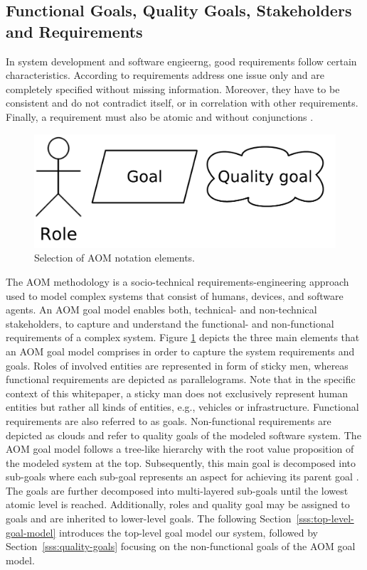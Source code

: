 \documentclass{llncs}
\begin{document}
{		\subsection{Functional Goals, Quality Goals, Stakeholders and Requirements}
			\label{ss:requirement-engineering}
						
			In system development and software engieerng, good requirements follow certain characteristics. According to \cite{davis1993software}\cite{ieee1994ieee} requirements address one issue only and are completely specified without missing information. Moreover, they have to be consistent and do not contradict itself, or in correlation with other requirements. Finally, a requirement must also be atomic and without conjunctions \cite{norta2014reference}.

			\begin{figure}[H]
				\centering
				\includegraphics[scale=0.2]{Figures/20180426_AOM-notation.pdf}
				\caption{Selection of AOM notation elements.}	
				\label{fig:aom-notaion-elements}
			\end{figure}				
			The AOM methodology is a socio-technical requirements-engineering approach used to model complex systems that consist of humans, devices, and software agents. An AOM goal model enables both, technical- and non-technical stakeholders, to capture and understand the functional- and non-functional requirements of a complex system. Figure \ref{fig:aom-notaion-elements} depicts the three main elements that an AOM goal model comprises in order to capture the system requirements and goals. Roles of involved entities are represented in form of sticky men, whereas functional requirements are depicted as parallelograms. Note that in the specific context of this whitepaper, a sticky man does not exclusively represent human entities but rather all kinds of entities, e.g., vehicles or infrastructure. Functional requirements are also referred to as goals. Non-functional requirements are depicted as clouds and refer to quality goals of the modeled software system. The AOM goal model follows a tree-like hierarchy with the root value proposition of the modeled system at the top. Subsequently, this main goal is decomposed into sub-goals where each sub-goal represents an aspect for achieving its parent goal \cite{marshall2014agent}. The goals are further decomposed into multi-layered sub-goals until the lowest atomic level is reached. Additionally, roles and quality goal may be assigned to goals and are inherited to lower-level goals. The following Section~\ref{sss:top-level-goal-model} introduces the top-level goal model our system, followed by Section~\ref{sss:quality-goals} focusing on the non-functional goals of the AOM goal model.

}
\end{document}
